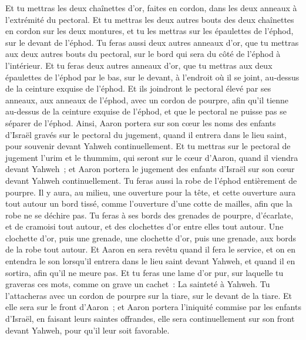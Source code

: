 \begin{multicols}{2}
Et tu mettras les deux chaînettes d'or, faites en cordon, dans les deux anneaux à l'extrémité du pectoral.
Et tu mettras les deux autres bouts des deux chaînettes en cordon sur les deux montures, et tu les mettras sur les épaulettes de l'éphod, sur le devant de l'éphod.
Tu feras aussi deux autres anneaux d'or, que tu mettras aux deux autres bouts du pectoral, sur le bord qui sera du côté de l'éphod à l'intérieur.
Et tu feras deux autres anneaux d'or, que tu mettras aux deux épaulettes de l'éphod par le bas, sur le devant, à l'endroit où il se joint, au-dessus de la ceinture exquise de l'éphod.
Et ils joindront le pectoral élevé par ses anneaux, aux anneaux de l'éphod, avec un cordon de pourpre, afin qu'il tienne au-dessus de la ceinture exquise de l'éphod, et que le pectoral ne puisse pas se séparer de l'éphod.
Ainsi, Aaron portera sur son cœur les noms des enfants d'Israël gravés sur le pectoral du jugement, quand il entrera dans le lieu saint, pour souvenir devant Yahweh continuellement.
Et tu mettras sur le pectoral de jugement l'urim et le thummim, qui seront sur le cœur d'Aaron, quand il viendra devant Yahweh~; et Aaron portera le jugement des enfants d'Israël sur son cœur devant Yahweh continuellement.
Tu feras aussi la robe de l'éphod entièrement de pourpre.
Il y aura, au milieu, une ouverture pour la tête, et cette ouverture aura tout autour un bord tissé, comme l'ouverture d'une cotte de mailles, afin que la robe ne se déchire pas.
Tu feras à ses bords des grenades de pourpre, d'écarlate, et de cramoisi tout autour, et des clochettes d'or entre elles tout autour.
Une clochette d'or, puis une grenade, une clochette d'or, puis une grenade, aux bords de la robe tout autour.
Et Aaron en sera revêtu quand il fera le service, et on en entendra le son lorsqu'il entrera dans le lieu saint devant Yahweh, et quand il en sortira, afin qu'il ne meure pas.
Et tu feras une lame d'or pur, sur laquelle tu graveras ces mots, comme on grave un cachet~: La sainteté à Yahweh.
Tu l'attacheras avec un cordon de pourpre sur la tiare, sur le devant de la tiare.
Et elle sera sur le front d'Aaron~; et Aaron portera l'iniquité commise par les enfants d'Israël, en faisant leurs saintes offrandes, elle sera continuellement sur son front devant Yahweh, pour qu'il leur soit favorable.

\end{multicols}

